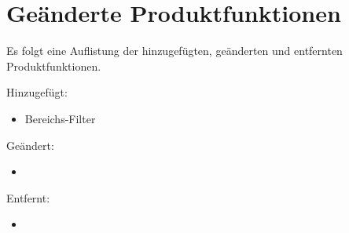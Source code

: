 \FloatBarrier
\section{Geänderte Produktfunktionen}

Es folgt eine Auflistung der hinzugefügten, geänderten und entfernten Produktfunktionen.

Hinzugefügt:
\begin{itemize}
	\item Bereichs-Filter
\end{itemize}

Geändert:
\begin{itemize}
	\item 
\end{itemize}

Entfernt:
\begin{itemize}
	\item 
\end{itemize}